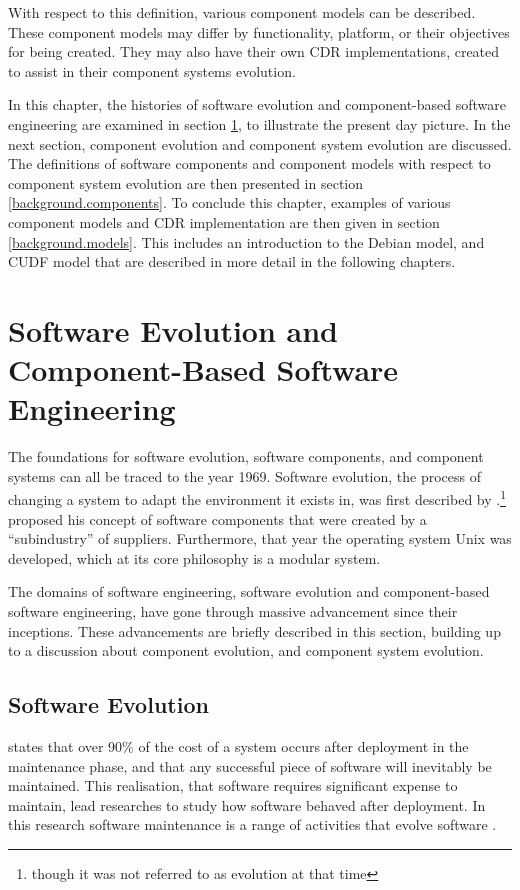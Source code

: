 With respect to this definition, various component models can be described.
These component models may differ by functionality, platform, or their objectives for being created.
They may also have their own CDR implementations, created to assist in their component systems evolution. 

In this chapter, the histories of software evolution and component-based software engineering are examined in section \ref{background.histories}, to illustrate the present day picture.
In the next section, component evolution and component system evolution are discussed.
The definitions of software components and component models with respect to component system evolution are then presented in section \ref{background.components}.
To conclude this chapter,  examples of various component models and CDR implementation are then given in section \ref{background.models}.
This includes an introduction to the Debian model, and CUDF model that are described in more detail in the following chapters.

\section{Software Evolution and Component-Based Software Engineering}
\label{background.histories}
The foundations for software evolution, software components, and component systems can all be traced to the year 1969.
Software evolution, the process of changing a system to adapt the environment it exists in, 
was first described by \cite{Lehman1969}.\footnote{though it was not referred to as evolution at that time}
\cite{McIlroy1969} proposed his concept of software components that were created by a ``subindustry'' of suppliers.
Furthermore, that year the operating system Unix \citep{raymond2003art} was developed, which at its core philosophy is a modular system.

The domains of software engineering, software evolution and component-based software engineering, have gone through massive advancement since their inceptions.
These advancements are briefly described in this section, building up to a discussion about component evolution, and component system evolution.

\subsection{Software Evolution}
\cite{Brooks1975} states that over 90\% of the cost of a system occurs after deployment in the maintenance phase,
and that any successful piece of software will inevitably be maintained.
This realisation, that software requires significant expense to maintain, lead researches to study how software behaved after deployment.
In this research software maintenance is a range of activities that evolve software \citep{lehman1980}.

